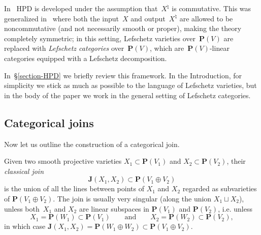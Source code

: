\documentclass[11pt, reqno]{amsart}
\numberwithin{equation}{section}
\theoremstyle{plain}
\theoremstyle{definition}
\newcommand{\hpd}{{\natural}}
\newcommand{\bJ}{\mathbf{J}}
\newcommand{\bP}{\mathbf{P}}
\begin{document}
In~\cite{kuznetsov-hpd} HPD is developed under the assumption that~$X^\hpd$ is commutative. 
This was generalized in~\cite{NCHPD} where both the input~$X$ and output~$X^\hpd$ 
are allowed to be noncommutative (and not necessarily smooth or proper), making the theory completely symmetric; 
in this setting, Lefschetz varieties over~$\bP(V)$ are replaced with \emph{Lefschetz categories} over~$\bP(V)$, 
which are~$\bP(V)$-linear categories equipped with a Lefschetz decomposition.

In~\S\ref{section-HPD} we briefly review this framework. 
In the Introduction, 
for simplicity we stick as much as possible to the language of Lefschetz varieties, 
but in the body of the paper we work in the general setting of Lefschetz categories.

\subsection{Categorical joins} 
\label{subsection:intro-cat-joins}
Now let us outline the construction of a categorical join. 

Given two smooth projective varieties $X_1 \subset \bP(V_1)$ and $X_2 \subset \bP(V_2)$, their \emph{classical join} 
\begin{equation*}
\bJ(X_1, X_2) \subset \bP(V_1 \oplus V_2) 
\end{equation*} 
is the union of all the lines between points of $X_1$ and $X_2$ regarded as subvarieties of $\bP(V_1 \oplus V_2)$. 
The join is usually very singular (along the union $X_1 \sqcup X_2$), 
unless both~$X_1$ and $X_2$ are linear subspaces in $\bP(V_1)$ and $\bP(V_2)$, i.e. 
unless 
\begin{equation}
\label{eq:x12-linear}
X_1 = \bP(W_1) \subset \bP(V_1)
\qquad\text{and}\qquad
X_2 = \bP(W_2) \subset \bP(V_2),
\end{equation} 
in which case $\bJ(X_1,X_2) = \bP(W_1 \oplus W_2) \subset \bP(V_1 \oplus V_2)$.
\end{document}
